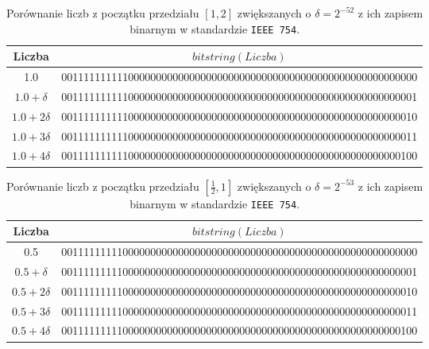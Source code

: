 \documentclass{article}
\begin{document}
\begin{table}[H]
\begin{adjustbox}{center}
\begin{tabular}{|c|c|}
    \hline
    Liczba & $bitstring(Liczba)$\\
    \hline
    1.0 & 0011111111110000000000000000000000000000000000000000000000000000\\
    \hline
    $1.0 + \delta$ & 0011111111110000000000000000000000000000000000000000000000000001\\
    \hline
    $1.0 + 2\delta$ & 0011111111110000000000000000000000000000000000000000000000000010\\
    \hline
    $1.0 + 3\delta$ & 0011111111110000000000000000000000000000000000000000000000000011\\
    \hline
    $1.0 + 4\delta$ & 0011111111110000000000000000000000000000000000000000000000000100\\
    \hline
\end{tabular}
\end{adjustbox}
\caption{Porównanie liczb z początku przedziału $[1, 2]$ zwiększanych o $\delta = 2^{-52}$ z ich zapisem binarnym w standardzie \texttt{IEEE 754}.}
\end{table}

\begin{table}[H]
\begin{adjustbox}{center}
\begin{tabular}{|c|c|}
    \hline
    Liczba & $bitstring(Liczba)$\\
    \hline
    0.5 & 0011111111100000000000000000000000000000000000000000000000000000\\
    \hline
    $0.5 + \delta$ & 0011111111100000000000000000000000000000000000000000000000000001\\
    \hline
    $0.5 + 2\delta$ & 0011111111100000000000000000000000000000000000000000000000000010\\
    \hline
    $0.5 + 3\delta$ & 0011111111100000000000000000000000000000000000000000000000000011\\
    \hline
    $0.5 + 4\delta$ & 0011111111100000000000000000000000000000000000000000000000000100\\
    \hline
\end{tabular}
\end{adjustbox}
\caption{Porównanie liczb z początku przedziału $[\frac{1}{2}, 1]$ zwiększanych o $\delta = 2^{-53}$ z ich zapisem binarnym w standardzie \texttt{IEEE 754}.}
\end{table}
\end{document}
